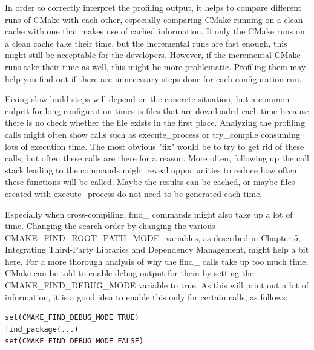 In order to correctly interpret the profiling output, it helps to compare different runs of CMake with each other, especially comparing CMake running on a clean cache with one that makes use of cached information. If only the CMake runs on a clean cache take their time, but the incremental runs are fast enough, this might still be acceptable for the developers. However, if the incremental CMake runs take their time as well, this might be more problematic. Profiling them may help you find out if there are unnecessary steps done for each configuration run.

Fixing slow build steps will depend on the concrete situation, but a common culprit for long configuration times is files that are downloaded each time because there is no check whether the file exists in the first place. Analyzing the profiling calls might often show calls such as execute\_process or try\_compile consuming lots of execution time. The most obvious "fix" would be to try to get rid of these calls, but often these calls are there for a reason. More often, following up the call stack leading to the commands might reveal opportunities to reduce how often these functions will be called. Maybe the results can be cached, or maybe files created with execute\_process do not need to be generated each time.

Especially when cross-compiling, find\_ commands might also take up a lot of time. Changing the search order by changing the various CMAKE\_FIND\_ROOT\_PATH\_MODE\_variables, as described in Chapter 5, Integrating Third-Party Libraries and Dependency Management, might help a bit here. For a more thorough analysis of why the find\_ calls take up too much time, CMake can be told to enable debug output for them by setting the CMAKE\_FIND\_DEBUG\_MODE variable to true. As this will print out a lot of information, it is a good idea to enable this only for certain calls, as follows:

\begin{lstlisting}[style=styleCMake]
set(CMAKE_FIND_DEBUG_MODE TRUE)
find_package(...)
set(CMAKE_FIND_DEBUG_MODE FALSE)
\end{lstlisting}

